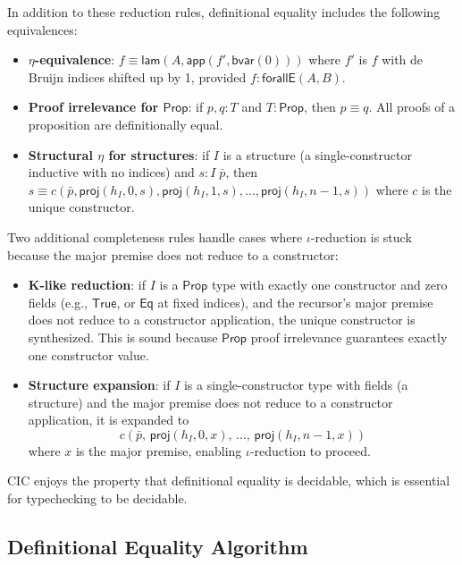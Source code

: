 \documentclass[11pt]{article}
\theoremstyle{definition}
\theoremstyle{plain}
\theoremstyle{remark}
\newcommand{\Prop}{\textsf{Prop}}
\newcommand{\Eq}{\textsf{Eq}}
\newcommand{\bvar}{\textsf{bvar}}
\newcommand{\app}{\textsf{app}}
\newcommand{\lam}{\textsf{lam}}
\newcommand{\forallE}{\textsf{forallE}}
\newcommand{\proj}{\textsf{proj}}
\begin{document}
In addition to these reduction rules, definitional equality includes the following
equivalences:

\begin{itemize}[nosep]
  \item \textbf{$\eta$-equivalence}: $f \equiv \lam(A, \app(f', \bvar(0)))$ where $f'$ is $f$ with de Bruijn indices shifted up by 1, provided $f : \forallE(A, B)$.

  \item \textbf{Proof irrelevance for $\Prop$}: if $p, q : T$ and $T : \Prop$, then $p \equiv q$.
        All proofs of a proposition are definitionally equal.

  \item \textbf{Structural $\eta$ for structures}: if $I$ is a structure (a single-constructor inductive with no indices) and $s : I \; \bar{p}$, then
        $s \equiv c(\bar{p}, \proj(h_I, 0, s), \proj(h_I, 1, s), \ldots, \proj(h_I, n{-}1, s))$
        where $c$ is the unique constructor.
\end{itemize}

Two additional completeness rules handle cases where $\iota$-reduction is stuck because the
major premise does not reduce to a constructor:

\begin{itemize}[nosep]
  \item \textbf{K-like reduction}: if $I$ is a $\Prop$ type with exactly one constructor
        and zero fields (e.g., $\textsf{True}$, or $\Eq$ at fixed indices), and the
        recursor's major premise does not reduce to a constructor application,
        the unique constructor is synthesized.
        This is sound because $\Prop$ proof irrelevance guarantees exactly one
        constructor value.

  \item \textbf{Structure expansion}: if $I$ is a single-constructor type with fields
        (a structure) and the major premise does not reduce to a constructor
        application, it is expanded to
        \[c(\bar{p},\, \proj(h_I, 0, x),\, \ldots,\, \proj(h_I, n{-}1, x))\]
        where $x$ is the major premise, enabling $\iota$-reduction to proceed.
\end{itemize}

CIC enjoys the property that definitional equality is decidable, which is essential for
typechecking to be decidable.

\subsection{Definitional Equality Algorithm}
\label{sec:defeq}
\end{document}
